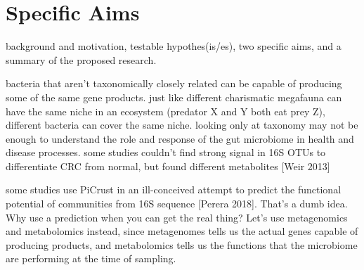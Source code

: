 \documentclass[12pt]{article}
\begin{document}
\sloppy
\section*{Specific Aims}

background and motivation, testable hypothes(is/es), two specific aims, and a summary of the proposed research. \cite{bikel_combining_2015}

bacteria that aren't taxonomically closely related can be capable of producing some of the same gene products.
just like different charismatic megafauna can have the same niche in an ecosystem (predator X and Y both eat prey Z), different bacteria can cover the same niche.
looking only at taxonomy may not be enough to understand the role and response of the gut microbiome in health and disease processes.
some studies couldn't find strong signal in 16S OTUs to differentiate CRC from normal, but found different metabolites [Weir 2013]

some studies use PiCrust in an ill-conceived attempt to predict the functional potential of communities from 16S sequence [Perera 2018].
That's a dumb idea. Why use a prediction when you can get the real thing?
Let's use metagenomics and metabolomics instead, since metagenomes tells us the actual genes capable of producing products, and metabolomics tells us the functions that the microbiome are performing at the time of sampling.
\end{document}
